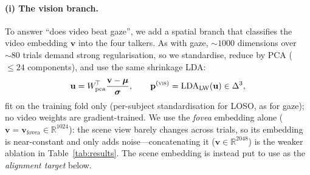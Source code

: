 \documentclass[10pt,twocolumn]{article}
\begin{document}
\paragraph{(i) The vision branch.}
To answer ``does video beat gaze'', we add a spatial branch that classifies the
video embedding $\mathbf v$ into the four talkers. As with gaze, $\sim\!1000$
dimensions over $\sim\!80$ trials demand strong regularisation, so we standardise,
reduce by PCA ($\le\!24$ components), and use the same shrinkage LDA:
\begin{equation}
\mathbf u=W_{\text{pca}}^{\!\top}\frac{\mathbf v-\boldsymbol\mu}{\boldsymbol\sigma},
\qquad
\mathbf p^{(\textsc{vis})}=\mathrm{LDA}_{\text{LW}}(\mathbf u)\in\Delta^3,
\label{eq:vis}
\end{equation}
fit on the training fold only (per-subject standardisation for LOSO, as for gaze);
no video weights are gradient-trained. We use the \emph{fovea} embedding alone
($\mathbf v\!=\!\mathbf v_{\text{fovea}}\!\in\!\mathbb R^{1024}$): the scene view
barely changes across trials, so its embedding is near-constant and only adds
noise---concatenating it ($\mathbf v\!\in\!\mathbb R^{2048}$) is the weaker
ablation in Table~\ref{tab:results}. The scene embedding is instead put to use as
the \emph{alignment target} below.
\end{document}
